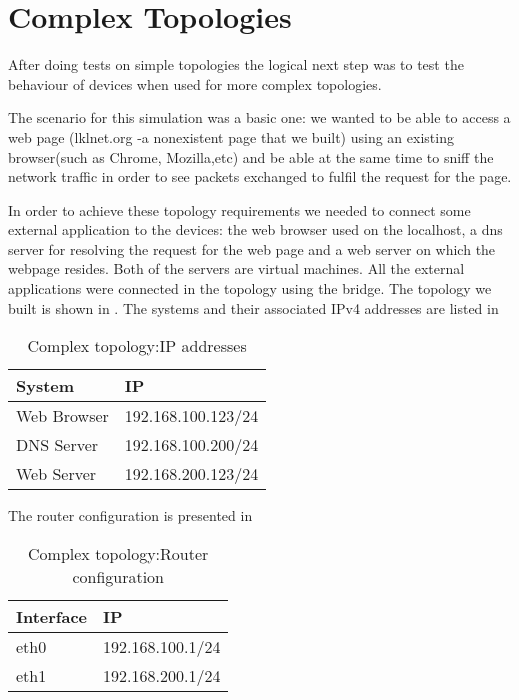 \section{Complex Topologies}
\label{sec:complex-top}
After doing tests on simple topologies the logical next step was to test the behaviour of \project devices when used for more complex topologies. 

The scenario for this simulation was a basic one: we wanted to be able to access a web page 
(lklnet.org -a nonexistent page that we built) using an existing browser(such as Chrome, Mozilla,etc) 
and be able at the same time to sniff the network traffic in order to see packets exchanged to fulfil the request for the page.

In order to achieve these topology requirements we needed to connect some external application to 
the \project devices: the web browser used on the localhost, a dns server for resolving the request for 
the web page and a web server on which the webpage resides. Both of the servers are virtual machines.
All the external applications were connected in the topology using the bridge.  
The topology we built is shown in .
The systems and their associated IPv4 addresses are listed in 
\begin{center}
  \begin{table}[htb]
  \begin{center}
  \begin{tabular}{| l | l |}
	\hline
	System & IP \\ \hline
	Web Browser & 192.168.100.123/24 \\ \hline
	DNS Server & 192.168.100.200/24 \\ \hline
	Web Server & 192.168.200.123/24 \\	 
    \hline
  \end{tabular}
  \end{center}
  \caption{Complex topology:IP addresses}
  \label{table:complex-ip}
  \end{table}
\end{center}
The router configuration is presented in 
\begin{center}
  \begin{table}[htb]
  \begin{center}
  \begin{tabular}{| l | l |}
	\hline
	Interface & IP \\ \hline
	eth0 & 192.168.100.1/24 \\ \hline
	eth1 & 192.168.200.1/24 \\	 
    \hline
  \end{tabular}
  \end{center}
  \caption{Complex topology:Router configuration}
  \label{table:complex-router}
  \end{table}
\end{center}
